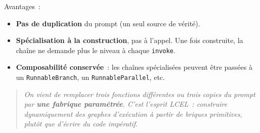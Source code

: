 \documentclass[11pt,a4paper]{article}
\begin{document}
\begin{center}
\end{center}

Avantages~:

\begin{itemize}[leftmargin=*]
  \item \textbf{Pas de duplication} du prompt (un seul source de vérité).
  \item \textbf{Spécialisation à la construction}, pas à l'appel. Une fois
        construite, la chaîne ne demande plus le niveau à chaque
        \texttt{invoke}.
  \item \textbf{Composabilité conservée}~: les chaînes spécialisées
        peuvent être passées à un \texttt{RunnableBranch}, un
        \texttt{RunnableParallel}, etc.
\end{itemize}

\begin{quote}\itshape
On vient de remplacer trois fonctions différentes ou trois copies du
prompt par \textbf{une fabrique paramétrée}. C'est l'esprit LCEL~:
construire dynamiquement des graphes d'exécution à partir de briques
primitives, plutôt que d'écrire du code impératif.
\end{quote}
\end{document}
